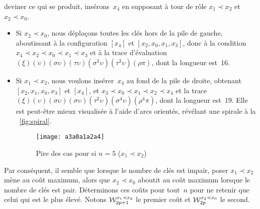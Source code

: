 deviner ce qui se produit, insérons~\(x_4\) en supposant à tour de
rôle \(x_1 \prec x_2\) et \(x_2 \prec x_0\).
\begin{itemize}

\item Si \(x_2 \prec x_0\), nous déplaçons toutes les clés hors de la
  pile de gauche, aboutissant à la configuration \([x_4]\) et \([x_2,
  x_0, x_1, x_3]\), donc à la condition \(x_4 \prec x_2 \prec x_0
  \prec x_1 \prec x_3\) et à la trace d'évaluation
  \((\xi)(\upsilon)(\sigma\upsilon)(\tau\upsilon)(\sigma^3\upsilon)
  (\tau^3\upsilon)(\rho\pi)\), dont la longueur est~\(16\).

\item Si \(x_1 \prec x_2\), nous voulons insérer~\(x_4\) au fond de la
  pile de droite, obtenant \([x_2, x_1, x_0, x_3]\) et \([x_4]\), et
  \(x_3 \prec x_0 \prec x_1 \prec x_2 \prec x_4\) et la trace
  \((\xi)(\upsilon)
  (\sigma\upsilon)(\sigma\upsilon)(\tau^2\upsilon)(\sigma^4\upsilon)
  (\rho^4\pi)\), dont la longueur est~\(19\). Elle est peut-être mieux
  visualisée à l'aide d'arcs orientés, révélant une spirale à la
  \fig~\vref{fig:spiral}.
  \begin{figure}
    \centering
    \texttt{[image: a3a0a1a2a4]}
    \caption{Pire des cas pour  si \(n=5\) (\(x_1 \prec x_2\))}
    \label{fig:spiral}
  \end{figure}

\end{itemize}
Par conséquent, il semble que lorsque le nombre de clés est impair,
poser \(x_1 \prec x_2\) mène au coût maximum, alors que \(x_2 \prec
x_0\) aboutit au coût maximum lorsque le nombre de clés est
pair. Déterminons ces coûts pour tout~\(n\) pour ne retenir que celui
qui est le plus élevé. Notons \(\W{x_1 \prec x_2}{2p+1}\) le premier
coût et \(\W{x_2 \prec x_0}{2p}\) le second.
